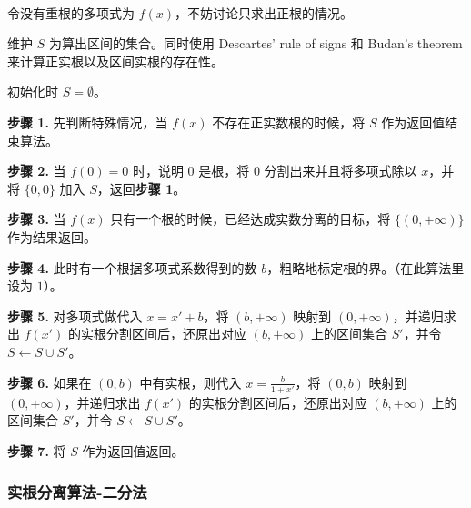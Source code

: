 \begin{algorithm}~

	令没有重根的多项式为 $f(x)$，不妨讨论只求出正根的情况。

	维护 $S$ 为算出区间的集合。同时使用 Descartes' rule of signs 和 Budan's theorem 来计算正实根以及区间实根的存在性。

	初始化时 $S = \emptyset$。

	\textbf{步骤 1.} 先判断特殊情况，当 $f(x)$ 不存在正实数根的时候，将 $S$ 作为返回值结束算法。

	\textbf{步骤 2.} 当 $f(0) = 0$ 时，说明 $0$ 是根，将 $0$ 分割出来并且将多项式除以 $x$，并将 $\{0, 0\}$ 加入 $S$，返回\textbf{步骤 1}。

	\textbf{步骤 3.} 当 $f(x)$ 只有一个根的时候，已经达成实数分离的目标，将 $\{(0, +\infty)\}$ 作为结果返回。

	\textbf{步骤 4.} 此时有一个根据多项式系数得到的数 $b$，粗略地标定根的界。（在此算法里设为 $1$）。

	\textbf{步骤 5.} 对多项式做代入 $x = x' + b$，将 $(b, +\infty)$ 映射到 $(0, +\infty)$，并递归求出 $f(x')$ 的实根分割区间后，还原出对应 $(b, +\infty)$ 上的区间集合 $S'$，并令 $S \leftarrow S \cup S'$。

	\textbf{步骤 6.} 如果在 $(0, b)$ 中有实根，则代入 $x = \frac{b}{1 + x'}$，将 $(0, b)$ 映射到 $(0, +\infty)$，并递归求出 $f(x')$ 的实根分割区间后，还原出对应 $(b, +\infty)$ 上的区间集合 $S'$，并令 $S \leftarrow S \cup S'$。

	\textbf{步骤 7.} 将 $S$ 作为返回值返回。


\end{algorithm}

\subsubsection{实根分离算法-二分法}

